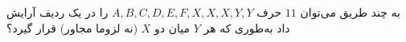     \p 
به چند طریق می‌توان
$11$
حرف
$A, B ,C, D, E, F, X, X, X, Y, Y$
را در یک ردیف آرایش داد به‌طوری که هر
$Y$
میان دو
$X$
(نه لزوما مجاور) قرار گیرد؟